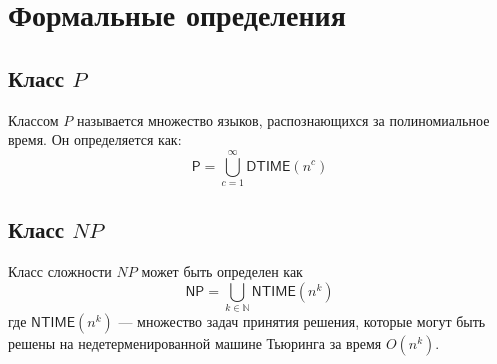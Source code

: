 \documentclass{article}
\begin{document}
\section{Формальные определения}
\subsection{Класс $P$}
Классом $P$ называется множество языков, распознающихся за полиномиальное время. Он определяется как:
$$
\mathsf{P}=\bigcup_{c=1}^\infty \mathsf{DTIME}(n^c)
$$ 
\cite{musatov}

\subsection{Класс $NP$}
Класс сложности $NP$ может быть определен как
$$
\mathsf{NP} = \bigcup_{k\in\mathbb{N}} \mathsf{NTIME}(n^k)
$$
где
$\mathsf{NTIME}(n^k)$ --- множество задач принятия решения, которые могут быть решены на недетерменированной машине Тьюринга за время $O(n^k)$\cite{wikiclassnp}.

\printbibliography
%
%
\end{document}
